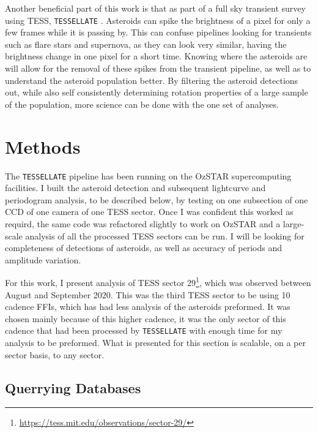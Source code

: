 \documentclass{UCreport}
\begin{document}
Another beneficial part of this work is that as part of a full sky transient survey using TESS, \texttt{TESSELLATE} \citep{TESSELLATE}.
Asteroids can spike the brightness of a pixel for only a few frames while it is passing by.
This can confuse pipelines looking for  transients such as flare stars and supernova, as they can look very similar, having the brightness change in one pixel for a short time.
Knowing where the asteroids are will allow for the removal of these spikes from the transient pipeline, as well as to understand the asteroid population better.
By filtering the asteroid detections out, while also self consistently determining rotation properties of a large sample of the population, more science can be done with the one set of analyses.


\section{Methods}\label{Sec:Meth}

The \texttt{TESSELLATE} pipeline has been running on the OzSTAR supercomputing facilities.
I built the asteroid detection and subsequent lightcurve and periodogram analysis, to be described below, by testing on one subsection of one CCD of one camera  of one TESS sector.
Once I was confident this worked as requird, the same code was refactored slightly to work on OzSTAR and a large-scale analysis of all the processed TESS sectors can be run. 
I will be looking for completeness of detections of asteroids, as well as accuracy of periods and amplitude variation.

For this work, I present analysis of TESS sector 29\footnote{\url{https://tess.mit.edu/observations/sector-29/}}, which was observed between  August and  September 2020.
This was the third TESS sector to be using \qty{10}{\min} cadence FFIs, which has had less analysis of the asteroids preformed.
It was chosen mainly because of this higher cadence, it was the only sector of this cadence that had been processed by \texttt{TESSELLATE} with enough time for my analysis to be preformed. 
What is presented for this section is scalable, on a per sector basis, to any sector.


\subsection{Querrying Databases}\label{SubSec:Querry}
\end{document}
